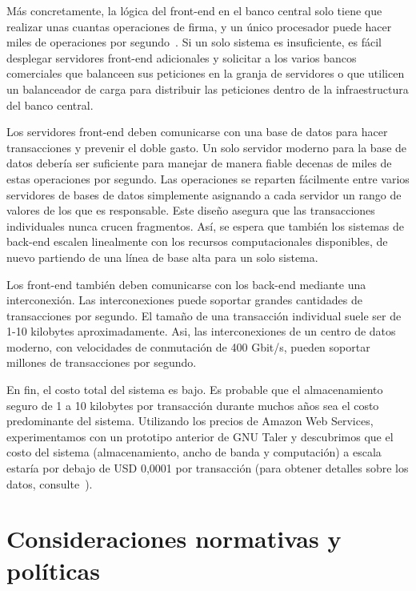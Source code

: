 \documentclass[10pt,spanish]{article}
\begin{document}
Más concretamente, la lógica del front-end en el banco central solo tiene que
realizar unas cuantas operaciones de firma, y un único procesador puede hacer
miles de operaciones por segundo~\cite[véase][]{Bernstein2020}. Si un solo
sistema es insuficiente, es fácil desplegar servidores front-end adicionales y
solicitar a los varios bancos comerciales que balanceen sus peticiones en la
granja de servidores o que utilicen un balanceador de carga para distribuir
las peticiones dentro de la infraestructura del banco central.

Los servidores front-end deben comunicarse con una base de datos para
hacer transacciones y prevenir el doble gasto. Un solo servidor moderno
para la base de datos debería ser suficiente para manejar de manera
fiable decenas de miles de estas operaciones por segundo. Las
operaciones se reparten fácilmente entre varios servidores de bases de
datos simplemente asignando a cada servidor un rango de valores de los
que es responsable. Este diseño asegura que las transacciones
individuales nunca crucen fragmentos. Así, se espera que también los
sistemas de back-end escalen linealmente con los recursos
computacionales disponibles, de nuevo partiendo de una línea de base
alta para un solo sistema.

Los front-end también deben comunicarse con los back-end mediante una
interconexión. Las interconexiones puede soportar grandes cantidades de
transacciones por segundo. El tamaño de una transacción individual suele
ser de 1-10 kilobytes aproximadamente. Asi, las interconexiones de un
centro de datos moderno, con velocidades de conmutación de 400 Gbit/s,
pueden soportar millones de transacciones por segundo.

En fin, el costo total del sistema es bajo. Es probable que el
almacenamiento seguro de 1 a 10 kilobytes por transacción durante muchos
años sea el costo predominante del sistema. Utilizando los precios de
Amazon Web Services, experimentamos con un prototipo anterior de GNU
Taler y descubrimos que el costo del sistema (almacenamiento, ancho de
banda y computación) a escala estaría por debajo de USD 0,0001 por
transacción (para obtener detalles sobre los datos, consulte~\citet{Dold}).

\hypertarget{consideraciones-normativas-y-poluxedticas}{%
\section{Consideraciones normativas y políticas}\label{5.-consideraciones-normativas-y-poluxedticas}}
\end{document}
